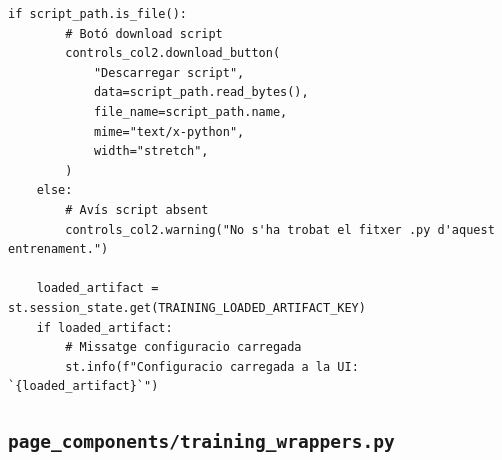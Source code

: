 \documentclass[10pt,a4paper]{article}
\begin{document}
\begin{lstlisting}[style=studioPython,caption={page\_components/training\_shared.py},label={lst:page-components-training-shared-py}]
    if script_path.is_file():
        # Botó download script
        controls_col2.download_button(
            "Descarregar script",
            data=script_path.read_bytes(),
            file_name=script_path.name,
            mime="text/x-python",
            width="stretch",
        )
    else:
        # Avís script absent
        controls_col2.warning("No s'ha trobat el fitxer .py d'aquest entrenament.")

    loaded_artifact = st.session_state.get(TRAINING_LOADED_ARTIFACT_KEY)
    if loaded_artifact:
        # Missatge configuracio carregada
        st.info(f"Configuracio carregada a la UI: `{loaded_artifact}`")
\end{lstlisting}


\subsection{\texorpdfstring{\texttt{page\_components/training\_wrappers.py}}{page\_components/training\_wrappers.py}}
\end{document}
